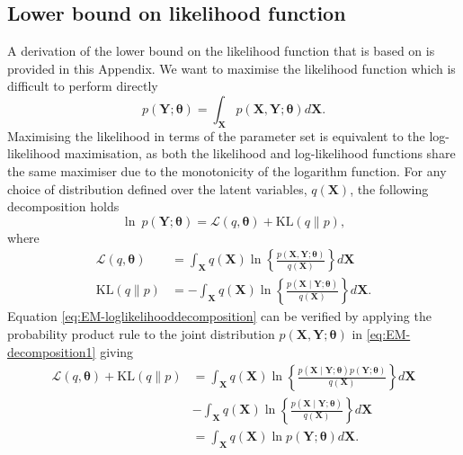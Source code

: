 \documentclass[review,authoryear,3p]{elsarticle}
\begin{document}
\subsection{Lower bound on likelihood function}\label{ap:Lowerbound}
A derivation of the lower bound on the likelihood function that is based on \citet{Bishop2006} is provided in this Appendix. We want to maximise the likelihood function which is difficult to perform directly
\begin{equation}
 p(\mathbf Y;\boldsymbol\theta)=\int_{\mathbf X}p(\mathbf X,\mathbf Y;\boldsymbol\theta)d\mathbf X.
\end{equation}   
Maximising the likelihood in terms of the parameter set is equivalent to the log-likelihood maximisation, as both the likelihood and log-likelihood functions share the same maximiser due to the monotonicity of the logarithm function. For any choice of distribution defined over the latent variables, $q(\mathbf X)$, the following decomposition holds
\begin{equation}\label{eq:EM-loglikelihooddecomposition}
 \ln~p(\mathbf Y;\boldsymbol\theta)=\mathcal{L}(q,\boldsymbol\theta)+\mathrm{KL}(q\parallel p),
\end{equation}
where
\begin{align}
 \mathcal{L}(q,\boldsymbol\theta)&=\int_{\mathbf X} q(\mathbf X)\ln\left\lbrace \frac{p(\mathbf X,\mathbf Y;\boldsymbol\theta)}{q(\mathbf X)} \right\rbrace d\mathbf X \label{eq:EM-decomposition1}\\
\mathrm{KL}(q\parallel p)&=-\int_{\mathbf X}q(\mathbf X)\ln\left\lbrace \frac{p(\mathbf X \mid \mathbf Y;\boldsymbol\theta)}{q(\mathbf X)} \right\rbrace d\mathbf X. \label{eq:EM-decomposition2}
\end{align}
Equation \eqref{eq:EM-loglikelihooddecomposition} can be verified by applying the probability product rule to the joint distribution $p(\mathbf X,\mathbf Y;\boldsymbol\theta)$ in \eqref{eq:EM-decomposition1} giving
\begin{align}
	\mathcal{L}(q,\boldsymbol\theta)+\mathrm{KL}(q\parallel p)&= \int_{\mathbf X} q(\mathbf X)\ln\left\lbrace \frac{p(\mathbf X \mid \mathbf Y;\boldsymbol\theta)p(\mathbf Y;\boldsymbol\theta)}{q(\mathbf X)} \right\rbrace d\mathbf X \nonumber\\
	&- \int_{\mathbf X}q(\mathbf X)\ln\left\lbrace \frac{p(\mathbf X \mid \mathbf Y;\boldsymbol\theta)}{q(\mathbf X)} \right\rbrace d\mathbf X\nonumber\\
	&= \int_{\mathbf X}q(\mathbf X)\ln p(\mathbf Y; \boldsymbol\theta)d\mathbf X.
\end{align}
\end{document}
